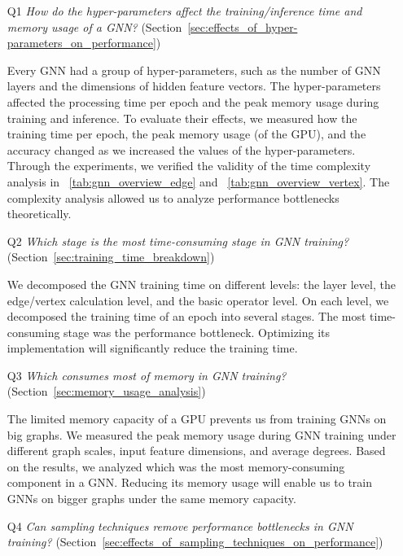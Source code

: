 \begin{itemize}

    \item[Q1] \emph{How do the hyper-parameters affect the training/inference time and memory usage of a GNN?} (Section~\ref{sec:effects_of_hyper-parameters_on_performance})

          Every GNN had a group of hyper-parameters, such as the number of GNN layers and the dimensions of hidden feature vectors.
          The hyper-parameters affected the processing time per epoch and the peak memory usage during training and inference.
          To evaluate their effects, we measured how the training time per epoch, the peak memory usage (of the GPU), and the accuracy changed as we increased the values of the hyper-parameters.
          Through the experiments, we verified the validity of the time complexity analysis in \tablename~\ref{tab:gnn_overview_edge} and \tablename~\ref{tab:gnn_overview_vertex}.
          The complexity analysis allowed us to analyze performance bottlenecks theoretically.

    \item[Q2] \emph{Which stage is the most time-consuming stage in GNN training?} (Section~\ref{sec:training_time_breakdown})

          We decomposed the GNN training time on different levels: the layer level, the edge/vertex calculation level, and the basic operator level.
          On each level, we decomposed the training time of an epoch into several stages.
          The most time-consuming stage was the performance bottleneck.
          Optimizing its implementation will significantly reduce the training time.

    \item[Q3] \emph{Which consumes most of memory in GNN training?} (Section~\ref{sec:memory_usage_analysis})

          The limited memory capacity of a GPU prevents us from training GNNs on big graphs.
          We measured the peak memory usage during GNN training under different graph scales, input feature dimensions, and average degrees.
          Based on the results, we analyzed which was the most memory-consuming component in a GNN.
          Reducing its memory usage will enable us to train GNNs on bigger graphs under the same memory capacity.

    \item[Q4] \emph{Can sampling techniques remove performance bottlenecks in GNN training?} (Section~\ref{sec:effects_of_sampling_techniques_on_performance})


\end{itemize}
